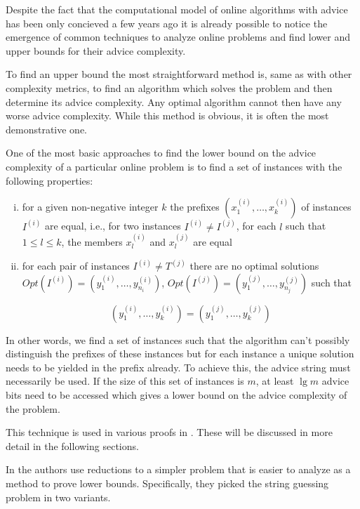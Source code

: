 
Despite the fact that the computational model of online algorithms with
advice has been only concieved a few years ago it is already possible to
notice the emergence of common techniques to analyze online problems and
find lower and upper bounds for their advice complexity.

To find an upper bound the most straightforward method is, same as with
other complexity metrics, to find an algorithm which solves the problem
and then determine its advice complexity. Any optimal algorithm cannot
then have any worse advice complexity. While this method is obvious, it is
often the most demonstrative one.

One of the most basic approaches to find the lower bound on the advice
complexity of a particular online problem is to find a set of instances
with the following properties:

\begin{enumerate}[(i)]
    \item
    for a given non-negative integer $k$ the prefixes $(x_1^{(i)}, \dots,
    x_k^{(i)})$ of instances $I^{(i)}$ are equal, i.e., for two instances
    $I^{(i)} \not= I^{(j)}$, for each $l$ such that $1 \leq l \leq k$,
    the members $x_l^{(i)}$ and $x_l^{(j)}$ are equal

    \item
    for each pair of instances $I^{(i)} \not= T^{(j)}$ there are no
    optimal solutions $Opt(I^{(i)}) = (y_1^{(i)}, \dots, y_{n_i}^{(i)})$,
    $Opt(I^{(j)}) = (y_1^{(j)}, \dots, y_{n_j}^{(j)})$ such that

    $$(y_1^{(i)}, \dots, y_{k}^{(i)}) = (y_1^{(j)}, \dots, y_{k}^{(j)})$$
\end{enumerate}

In other words, we find a set of instances such that the algorithm can't
possibly distinguish the prefixes of these instances but for each instance
a unique solution needs to be yielded in the prefix already. To achieve
this, the advice string must necessarily be used. If the size of this set
of instances is $m$, at least $\lg m$ advice bits need to be accessed
which gives a lower bound on the advice complexity of the problem.

This technique is used in various proofs in \cite{misof-trivial-graphs}.
These will be discussed in more detail in the following sections.

In \cite{string-guessing} the authors use reductions to a simpler problem
that is easier to analyze as a method to prove lower bounds. Specifically,
they picked the string guessing problem in two variants.

